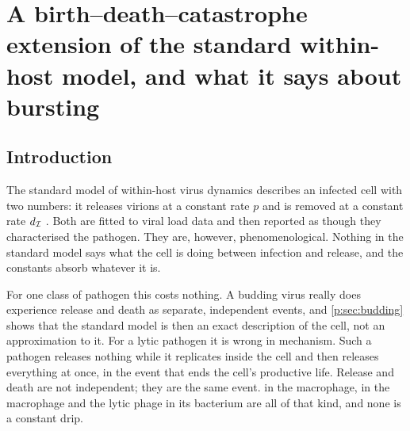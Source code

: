 %

\chapter[Burst-aware within-host dynamics]{A birth--death--catastrophe
extension of the standard within-host model, and what it says about
bursting}
\label{p:ch:one-cell-to-population}

\section{Introduction}
\label{p:sec:introduction}

The standard model of within-host virus dynamics describes an infected cell
with two numbers: it releases virions at a constant rate $p$ and is removed
at a constant rate $d_{\mathcal{I}}$
\cite{mclean1993balance,nowak1996population,perelson1996hiv}. Both are
fitted to viral load data and then reported as though they characterised the
pathogen. They are, however, phenomenological. Nothing in the standard model
says what the cell is doing between infection and release, and the constants
absorb whatever it is.

For one class of pathogen this costs nothing. A budding virus really does
experience release and death as separate, independent events, and
\cref{p:sec:budding} shows that the standard model is then an exact
description of the cell, not an approximation to it. For a lytic pathogen it
is wrong in mechanism. Such a pathogen releases nothing while it replicates
inside the cell and then releases everything at once, in the event that ends
the cell's productive life. Release and death are not independent; they are
the same event. \yp{} in the macrophage, \ft{} in the macrophage and the
lytic phage in its bacterium are all of that kind, and none is a constant
drip.

